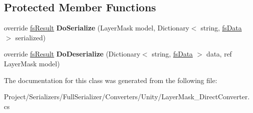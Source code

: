 \subsection*{Protected Member Functions}
\begin{DoxyCompactItemize}
\item 
\mbox{\label{class_full_serializer_1_1_internal_1_1_direct_converters_1_1_layer_mask___direct_converter_ac05514b589b5f07dc821d17e23f09a80}} 
override \hyperlink{struct_full_serializer_1_1fs_result}{fs\+Result} {\bfseries Do\+Serialize} (Layer\+Mask model, Dictionary$<$ string, \hyperlink{class_full_serializer_1_1fs_data}{fs\+Data} $>$ serialized)
\item 
\mbox{\label{class_full_serializer_1_1_internal_1_1_direct_converters_1_1_layer_mask___direct_converter_a5250547a17e4fdf730f9db241b3d36d0}} 
override \hyperlink{struct_full_serializer_1_1fs_result}{fs\+Result} {\bfseries Do\+Deserialize} (Dictionary$<$ string, \hyperlink{class_full_serializer_1_1fs_data}{fs\+Data} $>$ data, ref Layer\+Mask model)
\end{DoxyCompactItemize}


The documentation for this class was generated from the following file\+:\begin{DoxyCompactItemize}
\item 
Project/\+Serializers/\+Full\+Serializer/\+Converters/\+Unity/Layer\+Mask\+\_\+\+Direct\+Converter.\+cs\end{DoxyCompactItemize}

